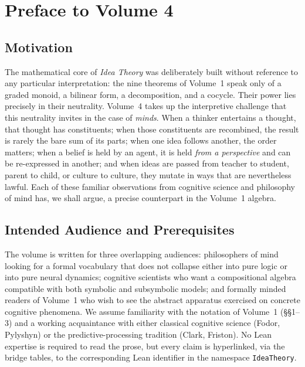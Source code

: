 \documentclass[11pt,oneside]{book}
\begin{document}
\tableofcontents

\chapter*{Preface to Volume 4}

\section*{Motivation}
The mathematical core of \emph{Idea Theory} was deliberately built
without reference to any particular interpretation: the nine
theorems of Volume~1 speak only of a graded monoid, a bilinear
form, a decomposition, and a cocycle.  Their power lies precisely in
their neutrality.  Volume~4 takes up the interpretive challenge that
this neutrality invites in the case of \emph{minds}.  When a thinker
entertains a thought, that thought has constituents; when those
constituents are recombined, the result is rarely the bare sum of
its parts; when one idea follows another, the order matters; when a
belief is held by an agent, it is held \emph{from a perspective} and
can be re-expressed in another; and when ideas are passed from
teacher to student, parent to child, or culture to culture, they
mutate in ways that are nevertheless lawful.  Each of these familiar
observations from cognitive science and philosophy of mind has, we
shall argue, a precise counterpart in the Volume~1 algebra.

\section*{Intended Audience and Prerequisites}
The volume is written for three overlapping audiences: philosophers
of mind looking for a formal vocabulary that does not collapse
either into pure logic or into pure neural dynamics; cognitive
scientists who want a compositional algebra compatible with both
symbolic and subsymbolic models; and formally minded readers of
Volume~1 who wish to see the abstract apparatus exercised on
concrete cognitive phenomena.  We assume familiarity with the
notation of Volume~1 (\S\S 1--3) and a working acquaintance with
either classical cognitive science (Fodor, Pylyshyn) or the
predictive-processing tradition (Clark, Friston).  No Lean
expertise is required to read the prose, but every claim is
hyperlinked, via the bridge tables, to the corresponding Lean
identifier in the namespace \texttt{IdeaTheory}.
\end{document}
